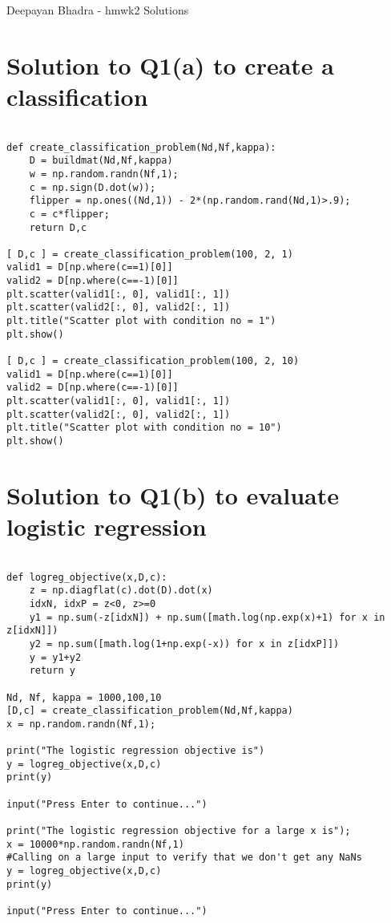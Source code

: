 \documentclass{article}
\begin{document}
\begin{center}{\huge  Deepayan Bhadra - hmwk2 Solutions}\end{center}

\section*{Solution to Q1(a) to create a classification}
\begin{verbatim}

def create_classification_problem(Nd,Nf,kappa):
    D = buildmat(Nd,Nf,kappa)
    w = np.random.randn(Nf,1);
    c = np.sign(D.dot(w));
    flipper = np.ones((Nd,1)) - 2*(np.random.rand(Nd,1)>.9);
    c = c*flipper;
    return D,c
	    
[ D,c ] = create_classification_problem(100, 2, 1)
valid1 = D[np.where(c==1)[0]]
valid2 = D[np.where(c==-1)[0]]
plt.scatter(valid1[:, 0], valid1[:, 1])
plt.scatter(valid2[:, 0], valid2[:, 1])
plt.title("Scatter plot with condition no = 1")
plt.show()

[ D,c ] = create_classification_problem(100, 2, 10)
valid1 = D[np.where(c==1)[0]]
valid2 = D[np.where(c==-1)[0]]
plt.scatter(valid1[:, 0], valid1[:, 1])
plt.scatter(valid2[:, 0], valid2[:, 1])
plt.title("Scatter plot with condition no = 10")
plt.show()

\end{verbatim}

\section*{Solution to Q1(b) to evaluate logistic regression}
\begin{verbatim}

def logreg_objective(x,D,c):
    z = np.diagflat(c).dot(D).dot(x)
    idxN, idxP = z<0, z>=0
    y1 = np.sum(-z[idxN]) + np.sum([math.log(np.exp(x)+1) for x in z[idxN]])
    y2 = np.sum([math.log(1+np.exp(-x)) for x in z[idxP]])
    y = y1+y2
    return y

Nd, Nf, kappa = 1000,100,10
[D,c] = create_classification_problem(Nd,Nf,kappa)
x = np.random.randn(Nf,1);

print("The logistic regression objective is")
y = logreg_objective(x,D,c)
print(y)

input("Press Enter to continue...")

print("The logistic regression objective for a large x is");
x = 10000*np.random.randn(Nf,1) 
#Calling on a large input to verify that we don't get any NaNs
y = logreg_objective(x,D,c)
print(y)

input("Press Enter to continue...")    


\end{verbatim}
\end{document}
